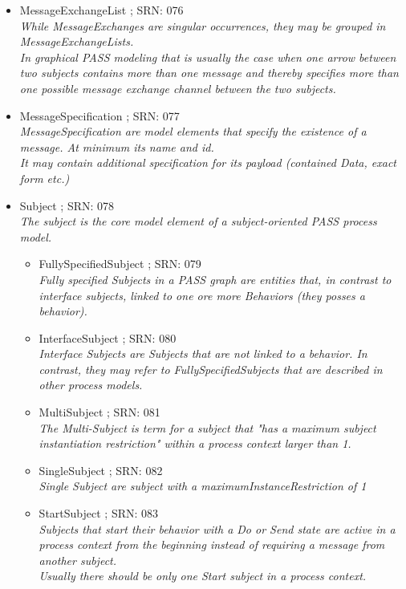 \begin{itemize}
\begin{itemize}
\begin{itemize}
{		While message exchanges are singular occurrences, they may be grouped in MessageExchangeLists}
		\item MessageExchangeList ; SRN: 076 \\ \textit{While MessageExchanges are singular occurrences, they may be grouped in MessageExchangeLists.\\
		In graphical PASS modeling that is usually the case when one arrow between two subjects contains more than one message and thereby specifies more than one possible message exchange channel between the two subjects.}
		\item MessageSpecification ; SRN: 077 \\ \textit{MessageSpecification are model elements that specify the existence of a message. At minimum its name and id.\\It may contain additional specification for its payload (contained Data, exact form etc.)}
		\item Subject ; SRN: 078 \\ \textit{The subject is the core model element of a subject-oriented PASS process model.}
		\begin{itemize}
			\item FullySpecifiedSubject ; SRN: 079 \\ \textit{Fully specified Subjects in a PASS graph are entities that, in contrast to interface subjects, linked to one ore more Behaviors (they posses a behavior).}
			\item InterfaceSubject ; SRN: 080 \\ \textit{Interface Subjects are Subjects that are not linked to a behavior. In contrast, they may refer to FullySpecifiedSubjects that are described in other process models.}
			\item MultiSubject ; SRN: 081 \\ \textit{The Multi-Subject is term for a subject that "has a maximum subject instantiation restriction" within a process context larger than 1.}
			\item SingleSubject ; SRN: 082 \\ \textit{Single Subject are subject with a maximumInstanceRestriction of 1}
			\item StartSubject ; SRN: 083 \\ \textit{Subjects that start their behavior with a Do or Send state are active in a process context from the beginning instead of requiring a message from another subject.\\
			Usually there should be only one Start subject in a process context.}
		\end{itemize}
	\end{itemize}
				

\end{itemize}
\end{itemize}
